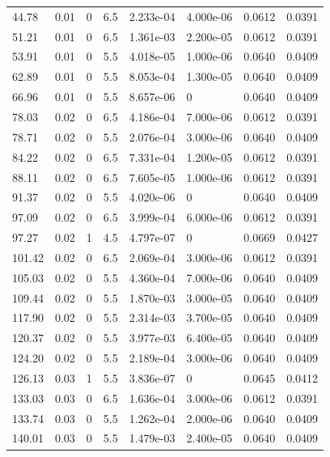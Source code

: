 \documentclass[preview]{standalone}
\begin{document}
{{\begin{tabular}{L{1.2cm}C{1.2cm} C{0.3cm}C{0.5cm} C{1.4cm}C{1.4cm} C{1.4cm}C{1.4cm}}
  44.78  &  0.01  & 0     & 6.5 &  2.233e-04  & 4.000e-06  & 0.0612 &  0.0391   \\ 
  51.21  &  0.01  & 0     & 6.5 &  1.361e-03  & 2.200e-05  & 0.0612 &  0.0391   \\ 
  53.91  &  0.01  & 0     & 5.5 &  4.018e-05  & 1.000e-06  & 0.0640 &  0.0409   \\ 
  62.89  &  0.01  & 0     & 5.5 &  8.053e-04  & 1.300e-05  & 0.0640 &  0.0409   \\ 
  66.96  &  0.01  & 0     & 5.5 &  8.657e-06  & 0  & 0.0640 &  0.0409   \\ 
  78.03  &  0.02  & 0     & 6.5 &  4.186e-04  & 7.000e-06  & 0.0612 &  0.0391   \\ 
  78.71  &  0.02  & 0     & 5.5 &  2.076e-04  & 3.000e-06  & 0.0640 &  0.0409   \\ 
  84.22  &  0.02  & 0     & 6.5 &  7.331e-04  & 1.200e-05  & 0.0612 &  0.0391   \\ 
  88.11  &  0.02  & 0     & 6.5 &  7.605e-05  & 1.000e-06  & 0.0612 &  0.0391   \\ 
  91.37  &  0.02  & 0     & 5.5 &  4.020e-06  & 0  & 0.0640 &  0.0409   \\ 
  97.09  &  0.02  & 0     & 6.5 &  3.999e-04  & 6.000e-06  & 0.0612 &  0.0391   \\ 
  97.27  &  0.02  & 1     & 4.5 &  4.797e-07  & 0  & 0.0669 &  0.0427   \\ 
  101.42  &  0.02  & 0     & 6.5 &  2.069e-04  & 3.000e-06  & 0.0612 &  0.0391   \\ 
  105.03  &  0.02  & 0     & 5.5 &  4.360e-04  & 7.000e-06  & 0.0640 &  0.0409   \\ 
  109.44  &  0.02  & 0     & 5.5 &  1.870e-03  & 3.000e-05  & 0.0640 &  0.0409   \\ 
  117.90  &  0.02  & 0     & 5.5 &  2.314e-03  & 3.700e-05  & 0.0640 &  0.0409   \\ 
  120.37  &  0.02  & 0     & 5.5 &  3.977e-03  & 6.400e-05  & 0.0640 &  0.0409   \\ 
  124.20  &  0.02  & 0     & 5.5 &  2.189e-04  & 3.000e-06  & 0.0640 &  0.0409   \\ 
  126.13  &  0.03  & 1     & 5.5 &  3.836e-07  & 0  & 0.0645 &  0.0412   \\ 
  133.03  &  0.03  & 0     & 6.5 &  1.636e-04  & 3.000e-06  & 0.0612 &  0.0391   \\ 
  133.74  &  0.03  & 0     & 5.5 &  1.262e-04  & 2.000e-06  & 0.0640 &  0.0409   \\ 
  140.01  &  0.03  & 0     & 5.5 &  1.479e-03  & 2.400e-05  & 0.0640 &  0.0409   \\ 

\end{tabular}}}
\end{document}

